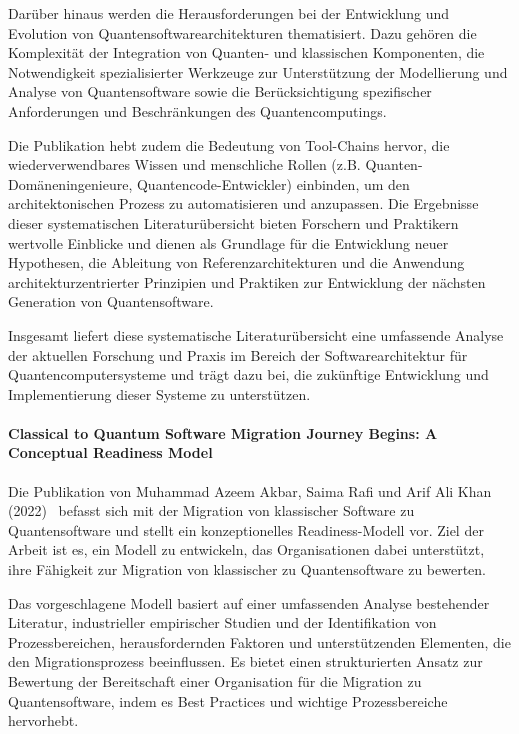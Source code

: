 Darüber hinaus werden die Herausforderungen bei der Entwicklung und Evolution von Quantensoftwarearchitekturen thematisiert. 
Dazu gehören die Komplexität der Integration von Quanten- und klassischen Komponenten, die Notwendigkeit spezialisierter 
Werkzeuge zur Unterstützung der Modellierung und Analyse von Quantensoftware sowie die Berücksichtigung spezifischer 
Anforderungen und Beschränkungen des Quantencomputings.

Die Publikation hebt zudem die Bedeutung von Tool-Chains hervor, die wiederverwendbares Wissen und menschliche 
Rollen (z.B. Quanten-Domäneningenieure, Quantencode-Entwickler) einbinden, um den architektonischen Prozess zu 
automatisieren und anzupassen. Die Ergebnisse dieser systematischen Literaturübersicht bieten Forschern und Praktikern 
wertvolle Einblicke und dienen als Grundlage für die Entwicklung neuer Hypothesen, die Ableitung von 
Referenzarchitekturen und die Anwendung architekturzentrierter Prinzipien und Praktiken zur Entwicklung der nächsten Generation von Quantensoftware.

Insgesamt liefert diese systematische Literaturübersicht eine umfassende Analyse der aktuellen Forschung und 
Praxis im Bereich der Softwarearchitektur für Quantencomputersysteme und trägt dazu bei, die zukünftige Entwicklung 
und Implementierung dieser Systeme zu unterstützen.

\paragraph{Classical to Quantum Software Migration Journey Begins: A Conceptual Readiness Model}

Die Publikation von Muhammad Azeem Akbar, Saima Rafi und Arif Ali Khan (2022)~\cite{Akbar_2022} befasst sich mit der Migration von klassischer 
Software zu Quantensoftware und stellt ein konzeptionelles Readiness-Modell vor. Ziel der Arbeit ist es, ein Modell 
zu entwickeln, das Organisationen dabei unterstützt, ihre Fähigkeit zur Migration von klassischer zu Quantensoftware zu bewerten.

Das vorgeschlagene Modell basiert auf einer umfassenden Analyse bestehender Literatur, industrieller empirischer 
Studien und der Identifikation von Prozessbereichen, herausfordernden Faktoren und unterstützenden Elementen, die 
den Migrationsprozess beeinflussen. Es bietet einen strukturierten Ansatz zur Bewertung der Bereitschaft einer 
Organisation für die Migration zu Quantensoftware, indem es Best Practices und wichtige Prozessbereiche hervorhebt.

